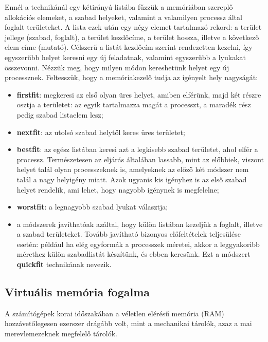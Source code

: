 \documentclass[tikz,12pt,margin=0px]{article}
\begin{document}
    \noindent Ennél a technikánál egy kétirányú listába fűzzük a memóriában szereplő allokációs elemeket, a szabad helyeket, valamint a valamilyen processz által foglalt területeket. A lista ezek után egy négy elemet tartalmazó rekord: a terület jellege (szabad, foglalt), a terület kezdőcíme, a terület hossza, illetve a következő elem címe (mutató). Célszerű a listát kezdőcím szerint rendezetten kezelni, így egyszerűbb helyet keresni egy új feladatnak, valamint egyszerűbb a lyukakat összevonni. Nézzük meg, hogy milyen módon kereshetünk helyet egy új processznek. Feltesszük, hogy a memóriakezelő tudja az igényelt hely nagyságát:
    \begin{itemize}[topsep=8pt,itemsep=4pt,partopsep=4pt, parsep=4pt]
        \item \textbf{firstfit}: megkeresi az első olyan üres helyet, amiben elférünk, majd két részre osztja a területet: az egyik tartalmazza magát a processzt, a maradék rész pedig szabad listaelem lesz;
        \item \textbf{nextfit}: az utolsó szabad helytől keres üres területet;
        \item \textbf{bestfit}: az egész listában keresi azt a legkisebb szabad területet, ahol elfér a processz. Természetesen az eljárás általában lassabb, mint az előbbiek, viszont helyet talál olyan processzeknek is, amelyeknek az előző két módszer nem talál a nagy helyigény miatt. Azok ugyanis kis igényhez is az első szabad helyet rendelik, ami lehet, hogy nagyobb igénynek is megfelelne;
        \item \textbf{worstfit}: a legnagyobb szabad lyukat választja;
        \item a módszerek javíthatóak azáltal, hogy külön listában kezeljük a foglalt, illetve a szabad területeket. Tovább javítható bizonyos előfeltételek teljesülése esetén: például ha elég egyformák a processzek méretei, akkor a leggyakoribb mérethez külön szabadlistát készítünk, és ebben keresünk. Ezt a módszert \textbf{quickfit} technikának nevezik.

    \end{itemize}

	\subsection*{Virtuális memória fogalma}
	
    \noindent A számítógépek korai időszakában a véletlen elérésű memória (RAM) hozzávetőlegesen ezerszer drágább volt, mint a mechanikai tárolók, azaz a mai merevlemezeknek megfelelő tárolók.\\
\end{document}
